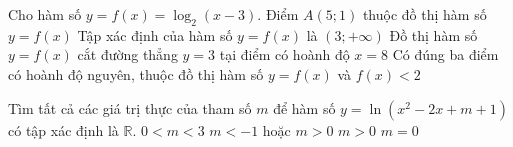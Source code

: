 \begin{ex}%
	Cho hàm số  $y=f(x)=\log_2 (x-3)$.
	\choiceTF 
		{\True Điểm $A(5;1)$  thuộc đồ thị hàm số $y=f(x)$}
		{\True  Tập xác định của hàm số $y=f(x)$ là $(3;+\infty)$}
		{Đồ thị hàm số $y=f(x)$ cắt đường thẳng $y=3$ tại điểm  có hoành độ $x=8$}
		{\True Có đúng ba điểm có hoành độ nguyên, thuộc đồ thị hàm số  $y=f(x)$ và $f(x)<2$}
\end{ex}

\begin{ex}%
	Tìm tất cả các giá trị thực của tham số $m$ để hàm số $y=\ln \left(x^2-2x+m+1\right)$ có tập xác  định là $\mathbb{R}$.
	 \choice
		{$0< m <  3$}
		{$m  <-1$ hoặc $m > 0$}
		 {\True $m > 0$}
		 {$m=0$}
\end{ex}
